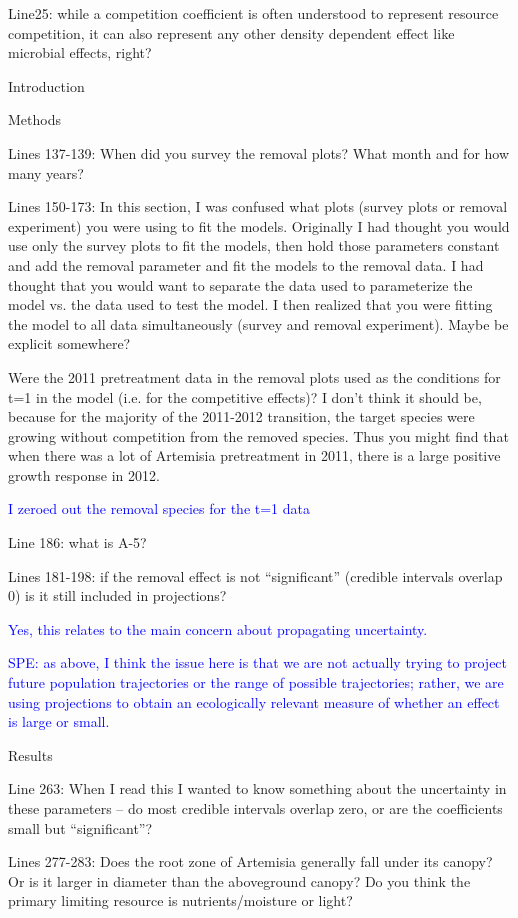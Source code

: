 \documentclass[12pt]{article}
\newcommand{\response}{\textcolor{blue}}
\begin{document}
{Line25: while a competition coefficient is often understood to represent resource competition, it can also represent any other density dependent effect like microbial effects, right?


Introduction

Methods

Lines 137-139:  When did you survey the removal plots? What month and for how many years? 

Lines 150-173: In this section, I was confused what plots (survey plots or removal experiment) you were using to fit the models. Originally I had thought you would use only the survey plots to fit the models, then hold those parameters constant and add the removal parameter and fit the models to the removal data. I had thought that you would want to separate the data used to parameterize the model vs. the data used to test the model. I then realized that you were fitting the model to all data simultaneously (survey and removal experiment). Maybe be explicit somewhere? 

Were the 2011 pretreatment data in the removal plots used as the conditions for t=1 in the model (i.e. for the competitive effects)? I don’t think it should be, because for the majority of the 2011-2012 transition, the target species were growing without competition from the removed species. Thus you might find that when there was a lot of Artemisia pretreatment in 2011, there is a large positive growth response in 2012.

\response{I zeroed out the removal species for the t=1 data}

Line 186: what is A-5?

Lines 181-198: if the removal effect is not “significant” (credible intervals overlap 0) is it still included in projections?

\response{Yes, this relates to the main concern about propagating uncertainty.}

\response{SPE: as above, I think the issue here is that we are not actually trying to project future population trajectories or the range of possible trajectories; rather, we are
using projections to obtain an ecologically relevant measure of whether an effect is large or small.} 

Results

Line 263:  When I read this I wanted to know something about the uncertainty in these parameters – do most credible intervals overlap zero, or are the coefficients small but “significant”?

Lines 277-283: Does the root zone of Artemisia generally fall under its canopy? Or is it larger in diameter than the aboveground canopy? Do you think the primary limiting resource is nutrients/moisture or light?

}
\end{document}
